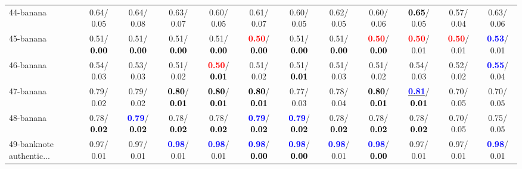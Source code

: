 \begin{table}[h]
\begin{center}
{\begin{tabular}{lc|c|c|c|c|c|c|c|c|c|c}
44-banana &   0.64/  0.05 &   0.64/  0.08 &   0.63/  0.07 &   0.60/  0.05 &   0.61/  0.07 &   0.60/  0.05 &   0.62/  0.05 &   0.60/  0.06 & \textcolor{black}{\textbf{  0.65}}/  0.05 &   0.57/  0.04 &   0.63/  0.06 \\
45-banana &   0.51/\textcolor{black}{\textbf{  0.00}} &   0.51/\textcolor{black}{\textbf{  0.00}} &   0.51/\textcolor{black}{\textbf{  0.00}} &   0.51/\textcolor{black}{\textbf{  0.00}} & \textcolor{red}{\textbf{  0.50}}/\textcolor{black}{\textbf{  0.00}} &   0.51/\textcolor{black}{\textbf{  0.00}} &   0.51/\textcolor{black}{\textbf{  0.00}} & \textcolor{red}{\textbf{  0.50}}/\textcolor{black}{\textbf{  0.00}} & \textcolor{red}{\textbf{  0.50}}/  0.01 & \textcolor{red}{\textbf{  0.50}}/  0.01 & \textcolor{blue}{\textbf{  0.53}}/  0.01 \\
46-banana &   0.54/  0.03 &   0.53/  0.03 &   0.51/  0.02 & \textcolor{red}{\textbf{  0.50}}/\textcolor{black}{\textbf{  0.01}} &   0.51/  0.02 &   0.51/\textcolor{black}{\textbf{  0.01}} &   0.51/  0.03 &   0.51/  0.02 &   0.54/  0.03 &   0.52/  0.02 & \textcolor{blue}{\textbf{  0.55}}/  0.04 \\ \hline
47-banana &   0.79/  0.02 &   0.79/  0.02 & \textcolor{black}{\textbf{  0.80}}/\textcolor{black}{\textbf{  0.01}} & \textcolor{black}{\textbf{  0.80}}/\textcolor{black}{\textbf{  0.01}} & \textcolor{black}{\textbf{  0.80}}/\textcolor{black}{\textbf{  0.01}} &   0.77/  0.03 &   0.78/  0.04 & \textcolor{black}{\textbf{  0.80}}/\textcolor{black}{\textbf{  0.01}} & \underline{\textcolor{blue}{\textbf{  0.81}}}/\textcolor{black}{\textbf{  0.01}} &   0.70/  0.05 &   0.70/  0.05 \\
48-banana &   0.78/\textcolor{black}{\textbf{  0.02}} & \textcolor{blue}{\textbf{  0.79}}/\textcolor{black}{\textbf{  0.02}} &   0.78/\textcolor{black}{\textbf{  0.02}} &   0.78/\textcolor{black}{\textbf{  0.02}} & \textcolor{blue}{\textbf{  0.79}}/\textcolor{black}{\textbf{  0.02}} & \textcolor{blue}{\textbf{  0.79}}/\textcolor{black}{\textbf{  0.02}} &   0.78/\textcolor{black}{\textbf{  0.02}} &   0.78/\textcolor{black}{\textbf{  0.02}} &   0.78/\textcolor{black}{\textbf{  0.02}} &   0.70/  0.05 &   0.75/  0.05 \\
49-banknote authentic... &   0.97/  0.01 &   0.97/  0.01 & \textcolor{blue}{\textbf{  0.98}}/  0.01 & \textcolor{blue}{\textbf{  0.98}}/  0.01 & \textcolor{blue}{\textbf{  0.98}}/\textcolor{black}{\textbf{  0.00}} & \textcolor{blue}{\textbf{  0.98}}/\textcolor{black}{\textbf{  0.00}} & \textcolor{blue}{\textbf{  0.98}}/  0.01 & \textcolor{blue}{\textbf{  0.98}}/\textcolor{black}{\textbf{  0.00}} &   0.97/  0.01 &   0.97/  0.01 & \textcolor{blue}{\textbf{  0.98}}/  0.01 \\

\end{tabular}}
\end{center}
\end{table}
